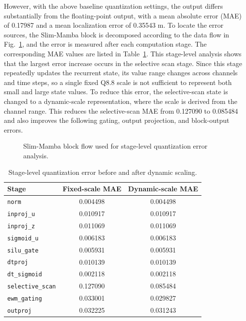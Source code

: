\documentclass[11pt,twoside]{eitExjobb}
\begin{document}
However, with the above baseline quantization settings, the output differs
substantially from the floating-point output, with a mean absolute error (MAE) of 0.17987 and a mean
localization error of 0.35543 m. To locate the error sources, the Slim-Mamba block is decomposed
according to the data flow in Fig.~\ref{fig:mamba_stage_flow}, and the error is measured
after each computation stage. The corresponding MAE values are
listed in Table~\ref{tab:stage_quant_error}. This stage-level analysis shows that the
largest error increase occurs in the selective scan stage. Since this stage repeatedly
updates the recurrent state, its value range changes across channels and time steps, so
a single fixed Q8.8 scale is not sufficient to represent both small and large state
values. To reduce this error, the selective-scan state is changed to a dynamic-scale
representation, where the scale is derived from the channel range. This reduces the
selective-scan MAE from 0.127090 to 0.085484 and also improves the following gating,
output projection, and block-output errors.

\begin{figure}[H]
  \centering
  
  \caption{Slim-Mamba block flow used for stage-level quantization error analysis.}
  \label{fig:mamba_stage_flow}
\end{figure}

\begin{table}[H]
\centering
\caption{Stage-level quantization error before and after dynamic scaling.}
\label{tab:stage_quant_error}
\small
\setlength{\tabcolsep}{6pt}
\begin{tabular}{l c c}
\hline
\textbf{Stage} & \textbf{Fixed-scale MAE} & \textbf{Dynamic-scale MAE} \\
\hline
\texttt{norm} & 0.004498 & 0.004498 \\
\texttt{inproj\_u} & 0.010917 & 0.010917 \\
\texttt{inproj\_z} & 0.011069 & 0.011069 \\
\texttt{sigmoid\_u} & 0.006183 & 0.006183 \\
\texttt{silu\_gate} & 0.005931 & 0.005931 \\
\texttt{dtproj} & 0.010139 & 0.010139 \\
\texttt{dt\_sigmoid} & 0.002118 & 0.002118 \\
\texttt{selective\_scan} & 0.127090 & 0.085484 \\
\texttt{ewm\_gating} & 0.033001 & 0.029827 \\
\texttt{outproj} & 0.032225 & 0.031243 \\
\hline
\end{tabular}
\end{table}
\end{document}
